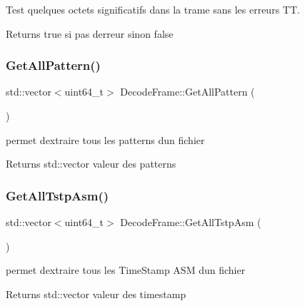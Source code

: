 Test quelques octets significatifs dans la trame sans les erreurs TT. 

\begin{DoxyReturn}{Returns}
true si pas d\textquotesingle{}erreur sinon false 
\end{DoxyReturn}
\mbox{\label{classDecodeFrame_a86005f4e7d6746978adc98b07e444d1c}} 
\subsubsection{\texorpdfstring{Get\+All\+Pattern()}{GetAllPattern()}}
{\footnotesize\ttfamily std\+::vector$<$uint64\+\_\+t$>$ Decode\+Frame\+::\+Get\+All\+Pattern (\begin{DoxyParamCaption}{ }\end{DoxyParamCaption})\hspace{0.3cm}{\ttfamily [inline]}}



permet d\textquotesingle{}extraire tous les patterns d\textquotesingle{}un fichier 

\begin{DoxyReturn}{Returns}
std\+::vector valeur des patterns 
\end{DoxyReturn}
\mbox{\label{classDecodeFrame_a0b3030ee5fcf599dfc15efa03b007a2d}} 
\subsubsection{\texorpdfstring{Get\+All\+Tstp\+Asm()}{GetAllTstpAsm()}}
{\footnotesize\ttfamily std\+::vector$<$uint64\+\_\+t$>$ Decode\+Frame\+::\+Get\+All\+Tstp\+Asm (\begin{DoxyParamCaption}{ }\end{DoxyParamCaption})\hspace{0.3cm}{\ttfamily [inline]}}



permet d\textquotesingle{}extraire tous les Time\+Stamp A\+SM d\textquotesingle{}un fichier 

\begin{DoxyReturn}{Returns}
std\+::vector valeur des timestamp 
\end{DoxyReturn}
\mbox{\label{classDecodeFrame_aaf768149c11e4f8393af44b73c0163c9}} 
